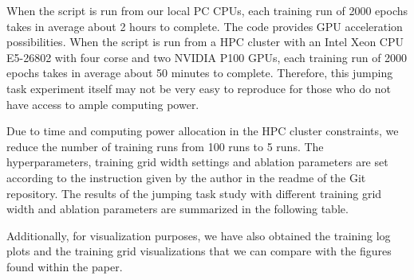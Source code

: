 \documentclass{usiinftr}
\begin{document}
When the script is run from our local PC CPUs, each training run of 2000 epochs takes in average about 2 hours to complete. The code provides GPU acceleration possibilities. When the script is run from a HPC cluster with an Intel Xeon CPU E5-26802 with four corse and two NVIDIA P100 GPUs, each training run of 2000 epochs takes in average about 50 minutes to complete. Therefore, this jumping task experiment itself may not be very easy to reproduce for those who do not have access to ample computing power.

Due to time and computing power allocation in the HPC cluster constraints, we reduce the number of training runs from 100 runs to 5 runs. The hyperparameters, training grid width settings and ablation parameters are set according to the instruction given by the author in the readme of the Git repository. The results of the jumping task study with different training grid width and ablation parameters are summarized in the following table.


Additionally, for visualization purposes, we have also obtained the training log plots and the training grid visualizations that we can compare with the figures found within the paper.
\end{document}

